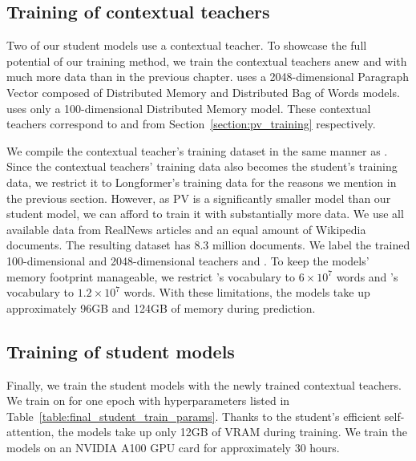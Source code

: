 \subsection{Training of contextual teachers}

Two of our student models use a contextual teacher. To showcase the full
potential of our training method, we train the contextual teachers anew and
with much more data than in the previous chapter. {\CosineStudent} uses a
2048-dimensional Paragraph Vector \citep{le2014distributed} composed of
Distributed Memory and Distributed Bag of Words models. {\MSEStudent} uses only
a 100-dimensional Distributed Memory model. These contextual teachers correspond to  and  from Section~\ref{section:pv_training} respectively.

We compile the contextual teacher's training dataset in the same manner as
. Since the contextual teachers' training
data also becomes the student's training data, we restrict it to Longformer's training data for the
reasons we mention in the previous section. However, as PV is a significantly
smaller model than our student model, we can afford to train it with
substantially more data. We use all available data from RealNews articles and
an equal amount of Wikipedia documents. The resulting dataset has 8.3 million
documents. We label the trained 100-dimensional and 2048-dimensional teachers
 and . To keep the models' memory footprint manageable, we
restrict 's vocabulary to $6\times 10^7$ words and 's
vocabulary to $1.2\times 10^7$ words. With these limitations, the models take
up approximately 96GB and 124GB of memory during prediction.

\subsection{Training of student models}

Finally, we train the student models with the newly trained contextual teachers.
We train on  for one epoch with hyperparameters listed in
Table~\ref{table:final_student_train_params}. Thanks to the student's efficient
self-attention, the models take up only 12GB of VRAM during training. We train
the models on an NVIDIA A100 GPU card for approximately 30 hours.

